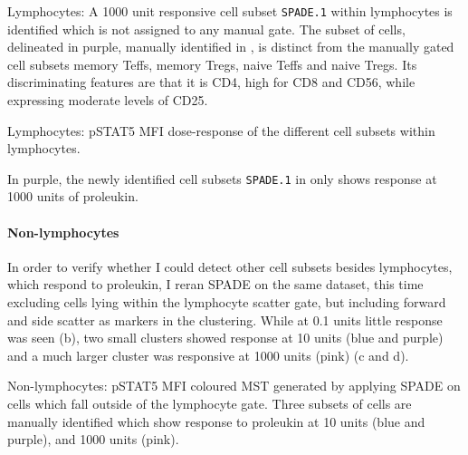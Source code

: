 { Lymphocytes: A 1000 unit responsive cell subset \texttt{SPADE.1} within lymphocytes is identified which is not assigned to any manual gate.  }
{
  The subset of cells, delineated in purple, manually identified in ,
  is distinct from the manually gated cell subsets memory Teffs, memory Tregs, naive Teffs and naive Tregs.
  Its discriminating features are that it is CD4\negative, high for CD8 and CD56, while expressing moderate levels of CD25.
}

{ Lymphocytes: pSTAT5 MFI dose-response of the different cell subsets within lymphocytes. }
{
    In purple, the newly identified cell subsets \texttt{SPADE.1} in  only shows response at 1000 units of proleukin.

}

\clearpage

\paragraph{Non-lymphocytes}

In order to verify whether I could detect other cell subsets besides lymphocytes, which respond to proleukin,
I reran \gls{SPADE} on the same dataset, this time excluding cells lying within the lymphocyte scatter gate,
but including forward and side scatter as markers in the clustering.
While at 0.1 units little response was seen (b),
two small clusters showed response at 10 units (blue and purple) and a much larger cluster was responsive at 1000 units (pink)
(c and d).

{Non-lymphocytes: pSTAT5 MFI coloured \gls{MST} generated by applying \gls{SPADE} on cells which fall outside of the lymphocyte gate.}
{
  Three subsets of cells are manually identified which show response to proleukin at 10 units (blue and purple),
  and 1000 units (pink).
}
% 

